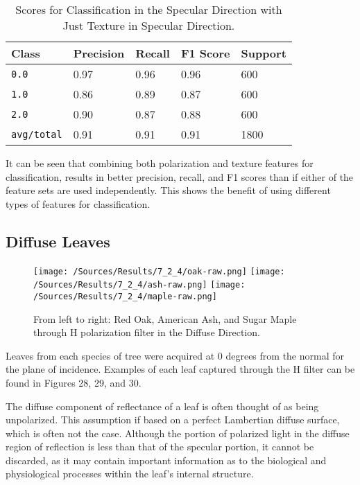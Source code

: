 %
\begin{table}[htb]
  \centering
  \begin{tabular}{lllll}
    \toprule
    \textbf{Class} & \textbf{Precision} & \textbf{Recall} & \textbf{F1 Score} & Support\\
    \midrule
      \texttt{0.0} & 0.97 & 0.96 & 0.96 & 600 \\
      \texttt{1.0} & 0.86 & 0.89 & 0.87 & 600 \\
      \texttt{2.0} & 0.90 & 0.87 & 0.88 & 600 \\
      \texttt{avg/total} & 0.91 & 0.91 & 0.91 & 1800 \\
    \bottomrule
  \end{tabular}
  \caption{%
    Scores for Classification in the Specular Direction with Just Texture in Specular Direction.
  }
  \label{tab:Packages}
\end{table}
%
It can be seen that combining both polarization and texture features for classification, results in better precision, recall, and F1 scores than if either of the feature sets are used independently.  This shows the benefit of using different types of features for classification.

\subsection{Diffuse Leaves}
%
\begin{figure}[htp]
    \centering
    \texttt{[image: /Sources/Results/7\_2\_4/oak-raw.png]}\hfill
    \texttt{[image: /Sources/Results/7\_2\_4/ash-raw.png]}\hfill
    \texttt{[image: /Sources/Results/7\_2\_4/maple-raw.png]}

    \caption{From left to right: Red Oak, American Ash, and Sugar Maple through H polarization filter in the Diffuse Direction.}
    \label{fig:specular-raw}
\end{figure}
%
Leaves from each species of tree were acquired at 0 degrees from the normal for the plane of incidence.  Examples of each leaf captured through the H filter can be found in Figures 28, 29, and 30.

The diffuse component of reflectance of a leaf is often thought of as being unpolarized.  This assumption if based on a perfect Lambertian diffuse surface, which is often not the case.  Although the portion of polarized light in the diffuse region of reflection is less than that of the specular portion, it cannot be discarded, as it may contain important information as to the biological and physiological processes within the leaf's internal structure.

